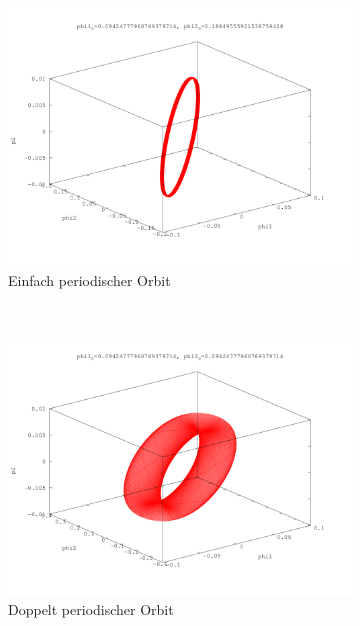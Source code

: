 \begin{figure}
        \centering
        \begin{subfigure}[b]{0.3\textwidth}
                \centering
                \includegraphics[width=\textwidth]{images/phasenraeume/phi2_is_2_phi1_6.png}
                \caption{Einfach periodischer Orbit}
        \end{subfigure}
        ~
        \begin{subfigure}[b]{0.3\textwidth}
                \centering
                \includegraphics[width=\textwidth]{images/phasenraeume/phi1_is_phi2_6.png}
                \caption{Doppelt periodischer Orbit}
        \end{subfigure}
        ~
        \begin{subfigure}[b]{0.3\textwidth}

\end{subfigure}
\end{figure}
